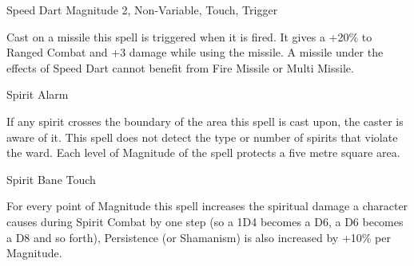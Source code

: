 \begin{rpg-spell}
{Speed Dart}
{Magnitude 2, Non-Variable, Touch, Trigger}

Cast on a missile this spell is triggered when it is fired. It gives a +20\% to Ranged Combat and +3 damage while using the missile. A missile under the effects of Speed Dart cannot benefit from Fire Missile or Multi Missile.
\end{rpg-spell}


\begin{rpg-spell}
{Spirit Alarm}
{}

If any spirit crosses the boundary of the area this spell is cast upon, the caster is aware of it. This spell does not detect the type or number of spirits that violate the ward. Each level of Magnitude of the spell protects a five metre square area.
\end{rpg-spell}


\begin{rpg-spell}
{Spirit Bane}
{Touch}

For every point of Magnitude this spell increases the spiritual damage a character causes during Spirit Combat by one step (so a 1D4 becomes a D6, a D6 becomes a D8 and so forth), Persistence (or Shamanism) is also increased by +10\% per Magnitude.
\end{rpg-spell}


